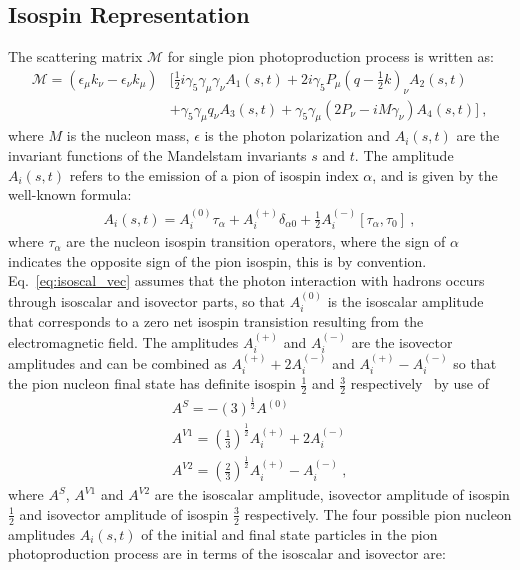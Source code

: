 \subsection{Isospin Representation}\label{sec:isospin}
The scattering matrix $\mathcal{M}$ for single pion photoproduction process is written as:
\begin{align}
\mathcal{M} =  (\epsilon_\mu k_\nu - \epsilon_\nu k_\mu)&[ \frac{1}{2}i \gamma_5 \gamma_\mu \gamma_\nu A_1(s,t) + 2 i \gamma_5 P_\mu(q-\frac{1}{2}k)_\nu A_2(s,t) \nonumber \\ & + \gamma_5 \gamma_\mu q_\nu A_3(s,t) + \gamma_5 \gamma_\mu(2P_\nu- i M\gamma_\nu) A_4(s,t) ] \ ,
\end{align}
where $M$ is the nucleon mass, $\epsilon$ is the photon polarization and $A_i(s,t)$ are the invariant functions of the Mandelstam invariants $s$ and $t$. The amplitude $A_i(s,t)$ refers to the emission of a pion of isospin index $\alpha$, and is given by the well-known formula:
\begin{align}\label{eq:isoscal_vec}
A_i(s,t)= A_i^{(0)}\tau_\alpha + A_i^{(+)}\delta_{\alpha 0} + \frac{1}{2} A_i^{(-)}\left[\tau_\alpha,\tau_0\right] \ ,
\end{align}
where $\tau_\alpha$ are the nucleon isospin transition operators, where the sign of $\alpha$ indicates the opposite sign of the pion isospin, this is by convention. Eq.~\ref{eq:isoscal_vec} assumes that the photon interaction with hadrons occurs through isoscalar and isovector parts, so that $A_i^{(0)}$ is the isoscalar amplitude that corresponds to a zero net isospin transistion resulting from the electromagnetic field. The amplitudes $A_i^{(+)}$ and $A_i^{(-)}$ are the isovector amplitudes and can be combined as $A_i^{(+)} + 2 A_i^{(-)}$ and $A_i^{(+)} - A_i^{(-)}$ so that the pion nucleon final state has definite isospin $\frac{1}{2}$ and $\frac{3}{2}$ respectively~\cite{Rosenfeld} by use of
\begin{align}
A^S = -(3)^\frac{1}{2}A^{(0)} \nonumber \\
A^{V1} = \left(\frac{1}{3}\right)^\frac{1}{2}A_i^{(+)} + 2 A_i^{(-)} \nonumber \\
A^{V2} = \left(\frac{2}{3}\right)^\frac{1}{2}A_i^{(+)} - A_i^{(-)} \ ,
\end{align}
where $A^S$, $A^{V1}$ and $A^{V2}$ are the isoscalar amplitude, isovector amplitude of isospin $\frac{1}{2}$ and isovector amplitude of isospin $\frac{3}{2}$ respectively.
The four possible pion nucleon amplitudes $A_i(s,t)$ of the initial and final state particles in the pion photoproduction process are in terms of the isoscalar and isovector are:
